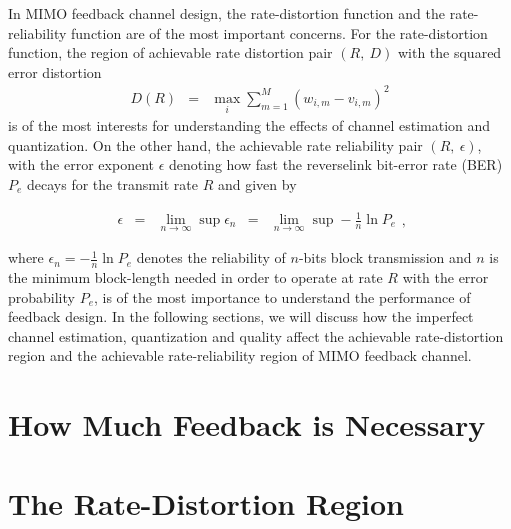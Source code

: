 \documentclass[10pt,fleqn, twocolumn]{IEEEtran}
\begin{document}
In MIMO feedback channel design, the rate-distortion function and
the rate-reliability function are of the most important concerns.
For the rate-distortion function, the region of achievable rate
distortion pair $\left(R,\ D\right)$ with the squared error
distortion
\begin{equation}
\begin{array}{rcl}
D\left(R\right)&=&\max\limits_{i}\sum\limits_{m=1}^{M}\left(w_{i,m}-v_{i,m}\right)^2
\end{array}\label{squared_error_distortion}
\end{equation}
\noindent is of the most interests for understanding the effects
of channel estimation and quantization. On the other hand, the
achievable rate reliability pair $\left(R,\ \epsilon\right)$, with
the error exponent $\epsilon$ denoting how fast the reverselink
bit-error rate (BER) $P_{e}$ decays for the transmit rate $R$ and
given by

\begin{equation}
\begin{array}{rcccl}
\epsilon&=&\lim\limits_{n\rightarrow\infty}\sup
\epsilon_{n}&=&\lim\limits_{n\rightarrow\infty}\sup-\frac{1}{n}\ln
P_{e}
\end{array},
\end{equation}

\noindent where $\epsilon_{n}=-\frac{1}{n}\ln P_{e}$ denotes the
reliability of $n$-bits block transmission and $n$ is the minimum
block-length needed in order to operate at rate $R$ with the error
probability $P_{e}$, is of the most importance to understand the
performance of feedback design. In the following sections, we will
discuss how the imperfect channel estimation, quantization and
quality affect the achievable rate-distortion region and the
achievable rate-reliability region of MIMO feedback channel.

\section{How Much Feedback is Necessary}

\section{The Rate-Distortion Region}
\end{document}
